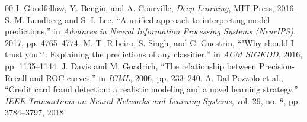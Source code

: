 \documentclass[conference]{IEEEtran}
\begin{document}
\begin{thebibliography}{00}
 I. Goodfellow, Y. Bengio, and A. Courville, \textit{Deep Learning}, MIT Press, 2016.
 S. M. Lundberg and S.-I. Lee, ``A unified approach to interpreting model predictions,'' in \textit{Advances in Neural Information Processing Systems (NeurIPS)}, 2017, pp. 4765--4774.
 M. T. Ribeiro, S. Singh, and C. Guestrin, ``"Why should I trust you?": Explaining the predictions of any classifier,'' in \textit{ACM SIGKDD}, 2016, pp. 1135--1144.
 J. Davis and M. Goadrich, ``The relationship between Precision-Recall and ROC curves,'' in \textit{ICML}, 2006, pp. 233--240.
 A. Dal Pozzolo et al., ``Credit card fraud detection: a realistic modeling and a novel learning strategy,'' \textit{IEEE Transactions on Neural Networks and Learning Systems}, vol. 29, no. 8, pp. 3784--3797, 2018.
\end{thebibliography}
\end{document}

